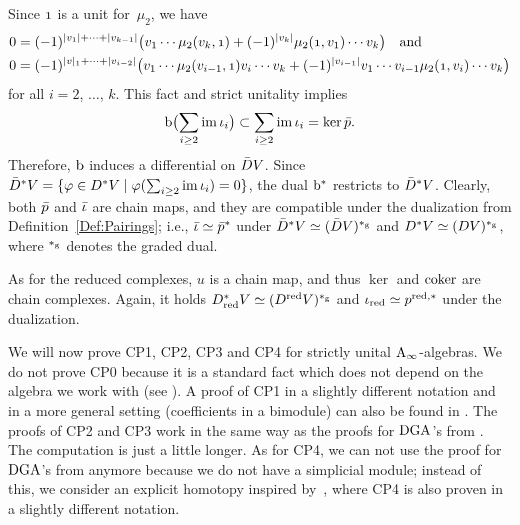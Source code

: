 \documentclass[\MainFolder/Text.tex]{subfiles}
\begin{document}
\begin{Remark}
Since $\NOne$ is a unit for~$\mu_2$, we have
\begin{align*}
0 & = (-1)^{\Abs{v_1} + \dotsb + \Abs{v_{k-1}}}\bigl(v_1 \dotsb \mu_2(v_k, \NOne) + (-1)^{\Abs{v_k}}\mu_2(\NOne,v_1)\dotsb v_k \bigr)\quad\text{and}\\
0 & = (-1)^{\Abs{v}_1 + \dotsb + \Abs{v_{i-2}}}\bigl(v_1 \dotsb \mu_2(v_{i-1}, \NOne) v_i \dotsb v_k + (-1)^{\Abs{v_{i-1}}} v_1 \dotsb  v_{i-1}\mu_2(\NOne, v_i) \dotsb v_k \bigr)
\end{align*}
for all $i=2$, $\dotsc$, $k$. This fact and strict unitality implies
\[ \mathrm{b}\bigl(\sum_{i\ge 2}\operatorname{im} \iota_i\bigr)\subset\sum_{i\ge 2}\operatorname{im} \iota_i = \ker \bar{p}.\]
Therefore, $\mathrm{b}$ induces a differential on $\bar{D} V$. Since $\bar{D}^* V = \{\varphi\in D^*V \mid \varphi(\sum_{i\ge 2}\operatorname{im}\iota_i) = 0\}$, the dual $\mathrm{b}^*$ restricts to $\bar{D}^* V$. Clearly, both $\bar{p}$ and $\bar{\iota}$ are chain maps, and they are compatible under the dualization from Definition~\ref{Def:Pairings}; i.e., $\bar{\iota} \simeq \bar{p}^*$ under $\bar{D}^* V \simeq (\bar{D} V)^{*_{\mathrm{g}}}$ and $D^* V \simeq (D V)^{*_{\mathrm{g}}}$, where $^{*_{\mathrm{g}}}$ denotes the graded dual.
 
As for the reduced complexes, $u$ is a chain map, and thus $\ker$ and $\operatorname{\mathrm{coker}}$ are chain complexes. Again, it holds $D_{\mathrm{red}}^* V \simeq (D^{\mathrm{red}} V)^{*_{\mathrm{g}}}$ and $\iota_{\mathrm{red}} \simeq p^{\mathrm{red},*}$ under the dualization.
\end{Remark}

We will now prove CP1, CP2, CP3 and CP4 for strictly unital $\mathrm{A}_\infty$-algebras. We do not prove CP0 because it is a standard fact which does not depend on the algebra we work with (see \cite{LodayCyclic}). A proof of CP1 in a slightly different notation and in a more general setting (coefficients in a bimodule) can also be found in \cite{Mescher2016}. The proofs of CP2 and CP3 work in the same way as the proofs for $\mathrm{DGA}$'s from \cite{LodayCyclic}. The computation is just a little longer. As for CP4, we can not use the proof for $\mathrm{DGA}$'s from \cite[Proposition~1.6.5]{LodayCyclic} anymore because we do not have a simplicial module; instead of this, we consider an explicit homotopy inspired by~\cite{Lazarev2003}, where CP4 is also proven in a slightly different notation.
\end{document}
